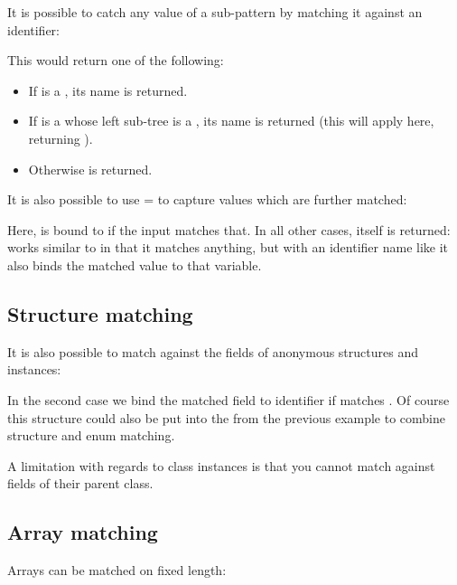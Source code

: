 It is possible to catch any value of a sub-pattern by matching it against an identifier:


This would return one of the following:

\begin{itemize}
	\item If  is a , its name is returned.
	\item If  is a  whose left sub-tree is a , its name is returned (this will apply here, returning ).
	\item Otherwise  is returned.
\end{itemize}

It is also possible to use = to capture values which are further matched:


Here,  is bound to  if the input matches that. In all other cases,  itself is returned:  works similar to  in that it matches anything, but with an identifier name like  it also binds the matched value to that variable.

\subsection{Structure matching}
\label{lf-pattern-matching-structure}

It is also possible to match against the fields of anonymous structures and instances:


In the second case we bind the matched  field to identifier  if  matches . Of course this structure could also be put into the  from the previous example to combine structure and enum matching.

A limitation with regards to class instances is that you cannot match against fields of their parent class.

\subsection{Array matching}
\label{lf-pattern-matching-array}

Arrays can be matched on fixed length:

